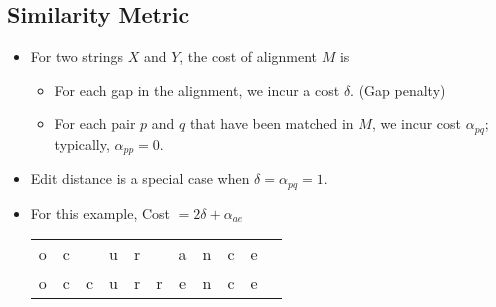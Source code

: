\subsection{Similarity Metric}
\begin{itemize}
    \item For two strings $X$ and $Y$, the cost of alignment $M$ is
    \begin{itemize}
        \item For each gap in the alignment, we incur a cost $\delta$. (Gap penalty)
        \item For each pair $p$ and $q$ that have been matched in $M$, we incur cost $\alpha_{pq}$; typically, $\alpha_{pp} = 0$.
    \end{itemize}
    \item Edit distance is a special case when $\delta = \alpha_{pq} = 1$.
    \item For this example, Cost $= 2\delta + \alpha_{ae}$
        \begin{center}
            \begin{tabular}{c c c c c c c c c c c}
                o & c &  & u & r &  & a & n & c & e \\
                o & c & c & u & r & r & e & n & c & e \\
            \end{tabular}
        \end{center}
\end{itemize}

